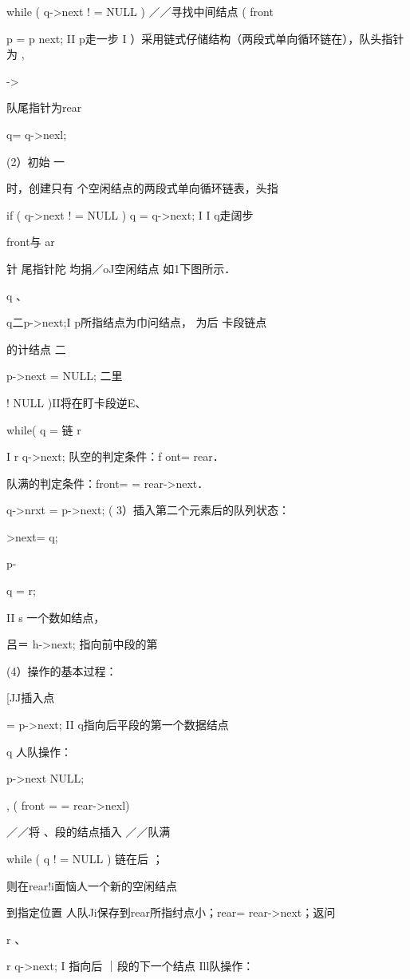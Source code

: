 {    while ( q->next !  = NULL )     ／／寻找中间结点    (    front

    p = p  next;     II p走一步    I ）采用链式仔储结构（两段式单向循环链在），队头指针为    ,

    ->

    队尾指针为rear

    q= q->nexl;

    (2）初始    一

    时，创建只有  个空闲结点的两段式单向循环链表，头指

    if ( q->next !  = NULL ) q = q->next; I I q走阔步

    front与    ar

    针    尾指针陀  均捐／oJ空闲结点  如1下图所示．

    q    、

    q二p->next;I  p所指结点为巾问结点， 为后 卡段链点

    的计结点    二

    p->next = NULL;    二里

    !    NULL )II将在盯卡段逆E、

    while( q   =     链    r

    I  r   q->next;    队空的判定条件：f ont=   rear．

    队满的判定条件：front= = rear->next．

    q->nrxt = p->next;    ( 3）插入第二个元素后的队列状态：

    >next= q;

    p-

    q = r;

    II s    一个数如结点，

    吕＝ h->next;     指向前中段的第

    (4）操作的基本过程：

    [JJ插入点

    = p->next;     II q指向后平段的第一个数据结点

    q    人队操作：

    p->next   NULL;    {, ( front = = rear->nexl)

    ／／将    、段的结点插入    ／／队满

    while ( q !  = NULL )     链在后    ；

    则在rear!i面恼人一个新的空闲结点

    到指定位置    人队Ji保存到rear所指纣点小；rear= rear->next；返问

    r    、

    r   q->next;     I   指向后 ｜段的下一个结点    Ill队操作：

}}
